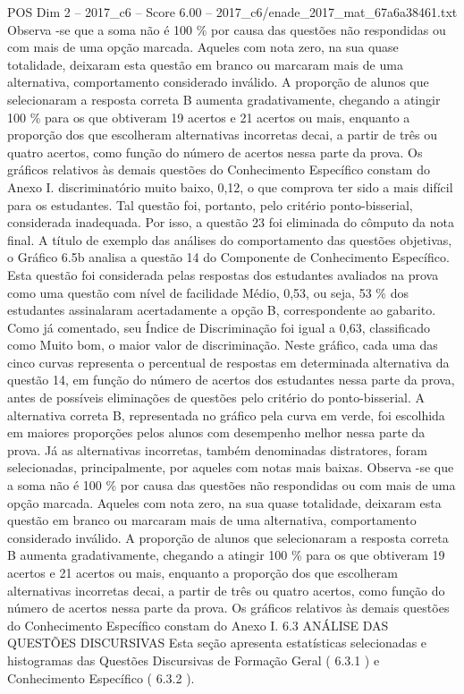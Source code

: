 \begin{textsample}{POS Dim 2 – 2017\_c6 – Score 6.00 – 2017\_c6/enade\_2017\_mat\_67a6a38461.txt}
Observa -se que a soma não é 100 \% por causa das questões não respondidas ou com mais de uma opção marcada.
Aqueles com nota zero, na sua quase totalidade, deixaram esta questão em branco ou marcaram mais de uma alternativa, comportamento considerado inválido.
A proporção de alunos que selecionaram a resposta correta B aumenta gradativamente, chegando a atingir 100 \% para os que obtiveram 19 acertos e 21 acertos ou mais, enquanto a proporção dos que escolheram alternativas incorretas decai, a partir de três ou quatro acertos, como função do número de acertos nessa parte da prova.
Os gráficos relativos às demais questões do Conhecimento Específico constam do Anexo I. discriminatório muito baixo, 0,12, o que comprova ter sido a mais difícil para os estudantes.
Tal questão foi, portanto, pelo critério ponto-bisserial, considerada inadequada.
Por isso, a questão 23 foi eliminada do cômputo da nota final.
A título de exemplo das análises do comportamento das questões objetivas, o Gráfico 6.5b analisa a questão 14 do Componente de Conhecimento Específico.
Esta questão foi considerada pelas respostas dos estudantes avaliados na prova como uma questão com nível de facilidade Médio, 0,53, ou seja, 53 \% dos estudantes assinalaram acertadamente a opção B, correspondente ao gabarito.
Como já comentado, seu Índice de Discriminação foi igual a 0,63, classificado como Muito bom, o maior valor de discriminação.
Neste gráfico, cada uma das cinco curvas representa o percentual de respostas em determinada alternativa da questão 14, em função do número de acertos dos estudantes nessa parte da prova, antes de possíveis eliminações de questões pelo critério do ponto-bisserial.
A alternativa correta B, representada no gráfico pela curva em verde, foi escolhida em maiores proporções pelos alunos com desempenho melhor nessa parte da prova.
Já as alternativas incorretas, também denominadas distratores, foram selecionadas, principalmente, por aqueles com notas mais baixas.
Observa -se que a soma não é 100 \% por causa das questões não respondidas ou com mais de uma opção marcada.
Aqueles com nota zero, na sua quase totalidade, deixaram esta questão em branco ou marcaram mais de uma alternativa, comportamento considerado inválido.
A proporção de alunos que selecionaram a resposta correta B aumenta gradativamente, chegando a atingir 100 \% para os que obtiveram 19 acertos e 21 acertos ou mais, enquanto a proporção dos que escolheram alternativas incorretas decai, a partir de três ou quatro acertos, como função do número de acertos nessa parte da prova.
Os gráficos relativos às demais questões do Conhecimento Específico constam do Anexo I. 6.3 ANÁLISE DAS QUESTÕES DISCURSIVAS Esta seção apresenta estatísticas selecionadas e histogramas das Questões Discursivas de Formação Geral ( 6.3.1 ) e Conhecimento Específico ( 6.3.2 ).

\end{textsample}
